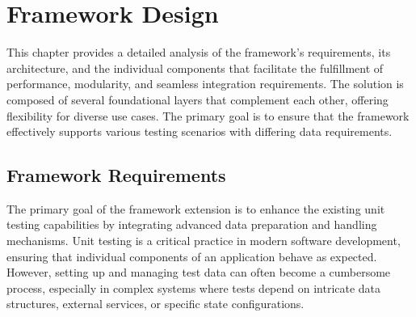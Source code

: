 
\chapter{Framework Design\label{chap:framework_design}}

This chapter provides a detailed analysis of the framework's requirements, its architecture, and the individual components that facilitate the fulfillment of performance, modularity, and seamless integration requirements. The solution is composed of several foundational layers that complement each other, offering flexibility for diverse use cases. The primary goal is to ensure that the framework effectively supports various testing scenarios with differing data requirements.

\section{Framework Requirements}

The primary goal of the framework extension is to
enhance the existing unit testing capabilities by integrating advanced data preparation and handling mechanisms.
Unit testing is a critical practice in modern software development,
ensuring that individual components of an application behave as expected.
However, setting up and managing test data can often become a cumbersome process,
especially in complex systems where tests depend on intricate data structures,
external services, or specific state configurations.

